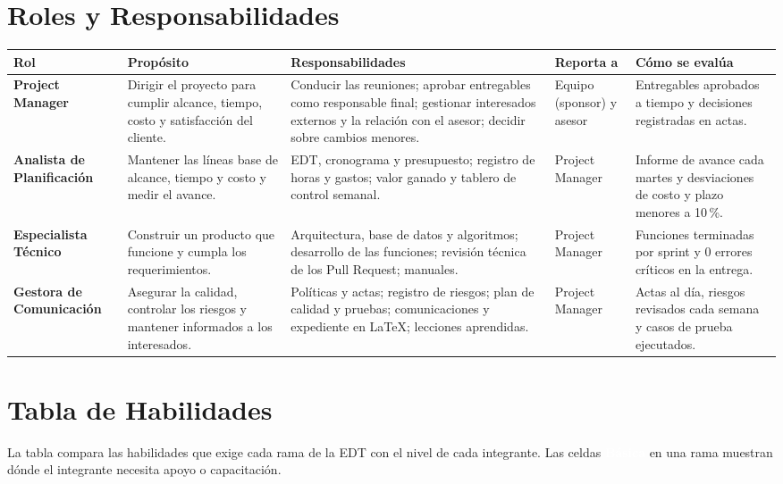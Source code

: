 \documentclass[11pt,a4paper]{article}
\newcommand{\etiqueta}[2]{{\setlength{\fboxsep}{2pt}\colorbox{#1}{\textcolor{white}{\scriptsize\bfseries #2}}}}
\begin{document}
\section{Roles y Responsabilidades}
{\small
\setlength{\tabcolsep}{3.5pt}
\noindent\begin{tabularx}{\textwidth}{@{}P{2.6cm} P{3.2cm} L P{1.9cm} P{3.1cm}@{}}
\toprule
{}
\textbf{Rol} & \textbf{Propósito} & \textbf{Responsabilidades} & \textbf{Reporta a} & \textbf{Cómo se evalúa} \\
\midrule
\textbf{Project Manager} & Dirigir el proyecto para cumplir alcance, tiempo, costo y satisfacción del cliente. & Conducir las reuniones; aprobar entregables como responsable final; gestionar interesados externos y la relación con el asesor; decidir sobre cambios menores. & Equipo (sponsor) y asesor & Entregables aprobados a tiempo y decisiones registradas en actas. \\
\textbf{Analista de Planificación} & Mantener las líneas base de alcance, tiempo y costo y medir el avance. & EDT, cronograma y presupuesto; registro de horas y gastos; valor ganado y tablero de control semanal. & Project Manager & Informe de avance cada martes y desviaciones de costo y plazo menores a 10\,\%. \\
\textbf{Especialista Técnico} & Construir un producto que funcione y cumpla los requerimientos. & Arquitectura, base de datos y algoritmos; desarrollo de las funciones; revisión técnica de los Pull Request; manuales. & Project Manager & Funciones terminadas por sprint y 0 errores críticos en la entrega. \\
\textbf{Gestora de Comunicación} & Asegurar la calidad, controlar los riesgos y mantener informados a los interesados. & Políticas y actas; registro de riesgos; plan de calidad y pruebas; comunicaciones y expediente en \LaTeX; lecciones aprendidas. & Project Manager & Actas al día, riesgos revisados cada semana y casos de prueba ejecutados. \\
\bottomrule
\end{tabularx}
}

\section{Tabla de Habilidades}
La tabla compara las habilidades que exige cada rama de la EDT con el nivel de cada integrante. Las celdas \etiqueta{NivBajo}{Básica} en una rama muestran dónde el integrante necesita apoyo o capacitación.
\end{document}
